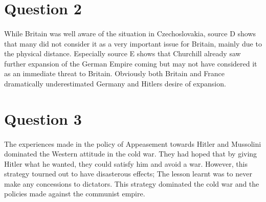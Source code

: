 \documentclass[11pt]{article}
\begin{document}
\section*{Question 2}
\paragraph{}
While Britain was well aware of the situation in Czechoslovakia, source D shows that many did not consider it as a very important issue for Britain, mainly due to the physical distance. Especially source E shows that Churchill already saw further expansion of the German Empire coming but may not have considered it as an immediate threat to Britain. Obviously both Britain and France dramatically underestimated Germany and Hitlers desire of expansion.

\section*{Question 3}
\paragraph{}
The experiences made in the policy of Appeasement towards Hitler and Mussolini dominated the Western attitude in the cold war. They had hoped that by giving Hitler what he wanted, they could satisfy him and avoid a war. However, this strategy tourned out to have disasterous effects; The lesson learnt was to never make any concessions to dictators. This strategy dominated the cold war and the policies made against the communist empire.
\end{document}
